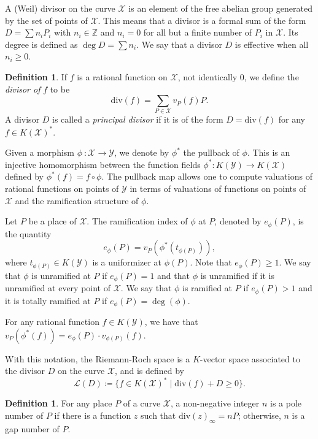 \documentclass[oneside,a4paper,12pt]{article}
\newcommand{\Z}{{\mathbb{Z}}} %
\theoremstyle{plain} %
\theoremstyle{definition} %
\newtheorem{definition}[theorem]{Definition}
\begin{document}
A (Weil) divisor on the curve $\mathcal{X}$ is an element of the free abelian group generated by the set of points of $\mathcal{X}$. This means that a divisor is a formal sum of the form $D=\sum n_i P_i$ with $n_i \in \Z$ and $n_i=0$ for all but a finite number of $P_i$ in $\mathcal{X}$. 
Its degree is defined as $\deg D =\sum n_i$. We say that a divisor $D$ is effective when all $n_i \geq 0$.

\begin{definition}
	If $f$ is a rational function on $\mathcal{X}$, not identically $0$, we define the \textit{divisor of} $f$ to be 
	\[
	\mathrm{div}(f) = \sum_{P \in \mathcal{X}} v_P(f) P.
	\]
    A divisor $D$ is called a \textit{principal divisor} if it is of the form $D=\mathrm{div}(f)$ for any $f\in K(\mathcal{X})^*$.
\end{definition}

Given a morphism $\phi~: \mathcal{X} \longrightarrow \mathcal{Y}$, we denote by $\phi^*$ the pullback of $\phi$. This is an injective homomorphism between the function fields  $\phi^*:K(\mathcal{Y}) \longrightarrow K(\mathcal{X})$
defined by $\phi^*(f)=f \circ \phi$. The pullback map allows one to compute valuations of rational functions on points of $\mathcal{Y}$ in terms of valuations of functions on points of $\mathcal{X}$ and the ramification structure of $\phi$. 

Let $P$ be a place of $\mathcal{X}$. The ramification index of $\phi$ at $P$, denoted by $e_\phi (P)$, is the quantity
\[
e_\phi(P)= v_P(\phi^* (t_{\phi(P)})),
\]
where $t_{\phi(P)} \in K(\mathcal{Y})$ is a uniformizer at $\phi(P)$. Note that $e_\phi(P) \geq 1$. We say that $\phi$
is unramified at $P$ if $e_{\phi}(P) = 1$  and that $\phi$ is unramified if it is unramified at every point of $\mathcal{X}$.
We say that $\phi$ is ramified at $P$ if $e_{\phi}(P) > 1$ and it is totally ramified at $P$ if $e_{\phi}(P) = \deg(\phi)$.

For any rational function $f\in K(\mathcal{Y})$, we have that $v_P(\phi^*(f))=e_{\phi}(P) \cdot v_{\phi(P)}(f)$.



With this notation, the Riemann-Roch space is a $K$-vector space associated to the divisor $D$ on the curve $\mathcal{X}$, and is defined by
$$\mathcal{L}(D)\coloneqq \{f \in K(\mathcal{X})^* \mid \mathrm{div}(f) + D \geq 0\}.$$

\begin{definition}
    For any place $P$ of a curve $\mathcal{X}$, a non-negative integer $n$ is a pole number of $P$ if there is a function $z$ such that $\mathrm{div}(z)_{\infty}= nP$; otherwise, $n$ is a gap number of $P$.  
\end{definition}
\end{document}
